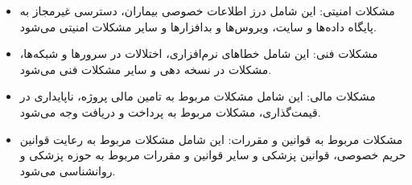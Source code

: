 \documentclass[a4paper]{article}
\begin{document}
		\begin{itemize}
			\item مشکلات امنیتی: این شامل درز اطلاعات خصوصی بیماران، دسترسی غیرمجاز به پایگاه داده‌ها و سایت، ویروس‌ها و بدافزارها و سایر مشکلات امنیتی می‌شود.
			\item مشکلات فنی: این شامل خطاهای نرم‌افزاری، اختلالات در سرورها و شبکه‌ها، مشکلات در نسخه دهی و سایر مشکلات فنی می‌شود.
			\item مشکلات مالی: این شامل مشکلات مربوط به تامین مالی پروژه، ناپایداری در قیمت‌گذاری، مشکلات مربوط به پرداخت و دریافت وجه می‌شود.
			\item مشکلات مربوط به قوانین و مقررات: این شامل مشکلات مربوط به رعایت قوانین حریم خصوصی، قوانین پزشکی و سایر قوانین و مقررات مربوط به حوزه پزشکی و روانشناسی می‌شود.
		\end{itemize}
	
	
\end{document}
